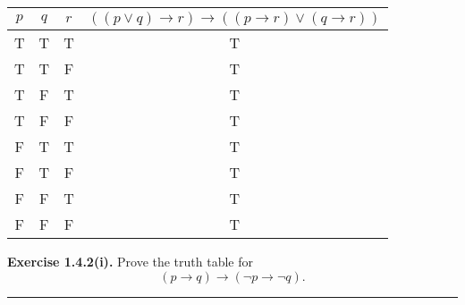 \documentclass{article}
\begin{document}
\begin{table}[h!]
	\begin{tabular}{ccc|c}
		$p$ & $q$ & $r$ & $\left( \left(p \vee q \right) \to r \right) \to \left( \left( p \to r \right) \vee \left(q \to r \right) \right)$ \\ \hline
		T   & T   & T   & T                                                                                                                  \\
		T   & T   & F   & T                                                                                                                  \\
		T   & F   & T   & T                                                                                                                  \\
		T   & F   & F   & T                                                                                                                  \\
		F   & T   & T   & T                                                                                                                  \\
		F   & T   & F   & T                                                                                                                  \\
		F   & F   & T   & T                                                                                                                  \\
		F   & F   & F   & T                                                                                                                  \\
	\end{tabular}
\end{table}

\newpage{}

\noindent\textbf{Exercise 1.4.2(i).} Prove the truth table for
\[
	\left( p \to q \right) \to \left( \lnot p \to \lnot q \right).
\]

\vspace{0.2cm}
\hrule{}
\vspace{0.2cm}
\end{document}
